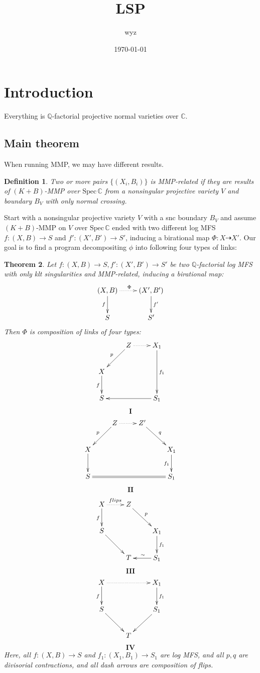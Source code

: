 \documentclass{article}
\title{LSP}
\author{wyz}
\date{\today}
\newtheorem{defn}{Definition}[section]
\newtheorem{thm}[defn]{Theorem}
\begin{document}
  \maketitle
  \tableofcontents
  \newpage

\section{Introduction}

Everything is $ \mathbb{Q} $-factorial projective    normal varieties over $ \mathbb{C} $.
\subsection{Main theorem}
When running MMP, we may have different results.
\begin{defn}
  Two or more pairs $ \{(X_i,B_i)\} $ is MMP-related if they are results of $ (K+B) $-MMP over $ \mathrm{Spec}\,\mathbb{C} $ from a nonsingular  projective variety $ V $ and  boundary $ B_V $ with only normal crossing.
\end{defn}
Start with a nonsingular projective variety $ V $ with a snc boundary $ B_V $ and assume $ (K+B) $-MMP on $ V $ over $ \mathrm{Spec}\,\mathbb{C} $ ended with two different log MFS $ f:(X,B)\to S$ and  $f':(X',B')\to S' $, inducing a birational map $ \Phi:X\dashrightarrow X' $. Our goal is to find a program decompositing $ \phi $ into following four types of links:

\begin{thm}
  Let $ f:(X,B)\to S,f':(X',B')\to S' $ be two $ \mathbb{Q} $-factorial log MFS  with only klt singularities and MMP-related, inducing a birational map:
  $$ \xymatrix{
    (X,B)\ar[d]_f\ar@{.>}[r]^\Phi&(X',B')\ar[d]^{f'}\\
    S&S'} $$
  Then $ \Phi  $ is composition  of links of  four types:
  $$ \xymatrix{
    &Z\ar[ld]_p\ar@{.>}[r]&X_1\ar[dd]^{f_1}\\
    X\ar[d]_f&&\\
    S &&S_1\ar[ll]}$$
  $$ \textbf{I} $$
  $$ \xymatrix{
    &Z\ar[ld]_p\ar@{.>}[r]&Z'\ar[dr]^{q}&\\
    X\ar[d]&&&X_1\ar[d]_{f_1}\\
    S\ar@{=}[rrr]&&&S_1} $$
  $$ \textbf{II} $$
  $$ \xymatrix{
    X\ar[d]_f\ar@{.>}[r]^{flips}&Z\ar[rd]^{p}&\\
    S\ar[dr]&&X_1\ar[d]^{f_1}\\
    &T&S_1\ar[l]_\sim}$$
  $$ \textbf{III} $$
  $$ \xymatrix{
    X\ar[d]_f\ar@{.>}[rr]&&X_1\ar[d]^{f_1}\\
    S\ar[dr]&&S_1\ar[dl]\\
    &T &}$$
  $$ \textbf{IV} $$
  Here, all $ f:(X,B)\to S $ and $ f_1:(X_1,B_1)\to S_1 $ are log MFS, and all $ p,q $ are divisorial contractions, and all dash arrows are composition of flips. 
\end{thm}
\end{document}
